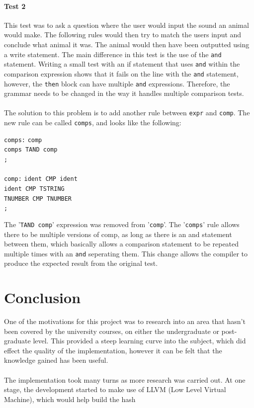\documentclass[12pt]{report}
\begin{document}
\subsubsection{Test 2}\label{sub:sub:sec:test2}
This test was to ask a question where the user would input the sound an animal would make.  The following rules would then try to match the users input and conclude what animal it was.  The animal would then have been outputted using a write statement.  The main difference in this test is the use of the \texttt{and} statement.  Writing a small test with an if statement that uses \texttt{and} within the comparison expression shows that it fails on the line with the \texttt{and} statement, however, the \texttt{then} block can have multiple \texttt{and} expressions.  Therefore, the grammar needs to be changed in the way it handles multiple comparison tests.\\
\\
The solution to this problem is to add another rule between \texttt{expr} and \texttt{comp}.  The new rule can be called \texttt{comps}, and looks like the following:\\
\begin{tabbing}
	\texttt{comps:} \= \texttt{comp}\\
	\> \texttt{\textbar \space comps TAND comp}\\
	\> \texttt{;}\\
	\\
	\texttt{comp:} \= \texttt{ident CMP ident}\\
	\> \texttt{\textbar \space ident CMP TSTRING}\\
	\> \texttt{\textbar \space TNUMBER CMP TNUMBER}\\
	\> \texttt{;}\\
\end{tabbing}
The '\texttt{TAND comp}' expression was removed from '\texttt{comp}'.  The '\texttt{comps}' rule allows there to be multiple versions of comp, as long as there is an and statement between them, which basically allows a comparison statement to be repeated multiple times with an \texttt{and} seperating them.  This change allows the compiler to produce the expected result from the original test.

\chapter{Conclusion}
One of the motivations for this project was to research into an area that hasn't been covered by the university courses, on either the undergraduate or post-graduate level.  This provided a steep learning curve into the subject, which did effect the quality of the implementation, however it can be felt that the knowledge gained has been useful.\\
\\
The implementation took many turns as more research was carried out.  At one stage, the development started to make use of LLVM (Low Level Virtual Machine), which would help build the hash
\end{document}
